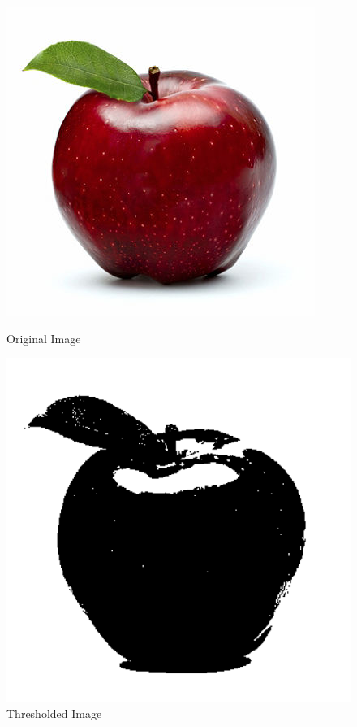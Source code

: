 \documentclass[titlepage]{article}
\begin{document}
\begin{figure}[H]
  \includegraphics[width=\linewidth]{Lion.jpeg}
  \caption{Original Image}\label{fig:lio}
\endminipage\hfill
{}
  \includegraphics[width=\linewidth]{Binary_Lion.png}
  \caption{Thresholded Image}\label{fig:glio}
\endminipage\hfill
\end{figure}
\end{document}
